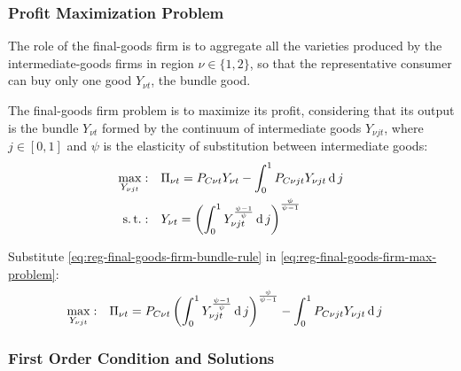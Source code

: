 \documentclass[
thesis.tex
]{subfiles}
\begin{document}
\subsubsection*{Profit Maximization Problem}

The role of the final-goods firm is to aggregate all the varieties produced by the intermediate-goods firms in region $\nu \in \{1,2\}$, so that the representative consumer can buy only one good $Y_{\nu t}$, the bundle good.



The final-goods firm problem is to maximize its profit, considering that its output is the bundle $Y_{\nu t}$ formed by the continuum of intermediate goods $Y_{\nu jt}$, where $j \in [0,1]$ and $\psi$ is the elasticity of substitution between intermediate goods:
\begin{align}
	\max_{Y_{\nu jt}}: &\quad \Pi_{\nu t} = P_{C\nu t} Y_{\nu t} - \int_{0}^{1} P_{C\nu jt} Y_{\nu jt} \operatorname{d} j \label{eq:reg-final-goods-firm-max-problem} \\
	\operatorname{s.t.}: & \quad Y_{\nu t} = \left( \int_{0}^{1} Y_{\nu jt}^{\frac{\psi-1}{\psi}} \operatorname{d} j \right)^{\frac{\psi}{\psi-1}} \label{eq:reg-final-goods-firm-bundle-rule}
\end{align}

Substitute \ref{eq:reg-final-goods-firm-bundle-rule} in \ref{eq:reg-final-goods-firm-max-problem}:
\begin{align}
	\label{eq:reg-final-goods-firm-max-problem-2}
	\max_{Y_{\nu jt}}: & \quad \Pi_{\nu t} = P_{C\nu t} \left( \int_{0}^{1} Y_{\nu jt}^{\frac{\psi-1}{\psi}} \operatorname{d} j \right)^{\frac{\psi}{\psi-1}} - \int_{0}^{1} P_{C\nu jt} Y_{\nu jt} \operatorname{d} j
\end{align}

\subsubsection*{First Order Condition and Solutions}
\end{document}

